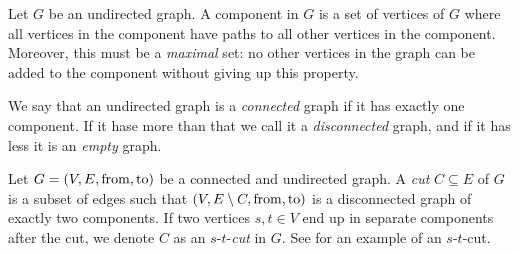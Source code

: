 \begin{definition}
    Let $G$ be an undirected graph. A component in $G$ is a set of vertices of $G$ where all vertices in the component have paths to all other vertices in the component. Moreover, this must be a \emph{maximal} set: no other vertices in the graph can be added to the component without giving up this property.
\end{definition}

\begin{definition}
    We say that an undirected graph is a \emph{connected} graph if it has exactly one component. If it hase more than that we call it a \emph{disconnected} graph, and if it has less it is an \emph{empty} graph.
\end{definition}

\begin{definition}[Cut]
    Let $G = (V, E, \operatorname{from}, \operatorname{to})$ be a connected and undirected graph. A \emph{cut} $C \subseteq E$ of $G$ is a subset of edges such that $(V, E \setminus C, \operatorname{from}, \operatorname{to})$ is a disconnected graph of exactly two components. If two vertices $s,t \in V$ end up in separate components after the cut, we denote $C$ as an $s$-$t$-\emph{cut} in $G$. See  for an example of an $s$-$t$-cut.
\end{definition}

